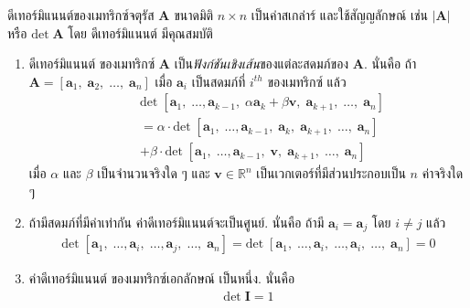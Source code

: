 %
ดีเทอร์มิแนนต์ของเมทริกซ์จตุรัส $\bm{A}$ ขนาดมิติ $n \times n$ เป็นค่าสเกล่าร์
และใช้สัญญลักษณ์ เช่น $|\bm{A}|$ หรือ $\mathrm{det}\; \bm{A}$
โดย 
ดีเทอร์มิแนนต์ มีคุณสมบัติ 
\begin{enumerate}
	\item ดีเทอร์มิแนนต์ ของเมทริกซ์ $\bm{A}$ 
เป็น\textit{ฟังก์ชันเชิงเส้น}ของแต่ละสดมภ์ของ $\bm{A}$.
	นั่นคือ
	ถ้า $\bm{A}=[\bm{a}_1, \; \bm{a}_2, \; \ldots, \; \bm{a}_n]$ เมื่อ $\bm{a}_i$ เป็นสดมภ์ที่ $i^{th}$ ของเมทริกซ์
	แล้ว
	\begin{eqnarray}
	\;& \; & \mathrm{det}\; 
	[\bm{a}_1, \; \ldots, \bm{a}_{k-1}, \;
	\alpha \bm{a}_k + \beta \bm{v}, \;
	\bm{a}_{k+1}, \; \ldots, \; \bm{a}_n]
	\nonumber \\
	\;& \; &
	=
	\alpha \cdot \mathrm{det}\; 
		[\bm{a}_1, \; \ldots, \bm{a}_{k-1}, \;
	\bm{a}_k, \;
	\bm{a}_{k+1}, \; \ldots, \; \bm{a}_n] 
	\nonumber \\
	\;& \; & 
	+ \beta \cdot  \mathrm{det}\; 
	[\bm{a}_1, \; \ldots, \bm{a}_{k-1}, \;
\bm{v}, \;
\bm{a}_{k+1}, \; \ldots, \; \bm{a}_n]
\label{eq: lin alg det prop 1}
	\end{eqnarray}
เมื่อ $\alpha$ และ $\beta$ เป็นจำนวนจริงใด ๆ
และ $\bm{v} \in \mathbb{R}^n$ เป็นเวกเตอร์ที่มีส่วนประกอบเป็น $n$ ค่าจริงใด ๆ
	\item ถ้ามีสดมภ์ที่มีค่าเท่ากัน
ค่าดีเทอร์มิแนนต์จะเป็นศูนย์.
	 นั่นคือ ถ้ามี $\bm{a}_i = \bm{a}_j$ โดย $i \neq j$ แล้ว
	 \begin{eqnarray}
	 \mathrm{det}\; 
	[\bm{a}_1, \; \ldots, \bm{a}_i, \; \ldots,
	 \bm{a}_j, \; \ldots, \; \bm{a}_n]
	 =
	 \mathrm{det}\; 
[\bm{a}_1, \; \ldots, \bm{a}_i, \; \ldots,
\bm{a}_i, \; \ldots, \; \bm{a}_n]
	 = 0
	 \label{eq: lin alg det prop 2}
	 \end{eqnarray}
	\item ค่าดีเทอร์มิแนนต์ ของเมทริกซ์เอกลักษณ์ เป็นหนึ่ง.
	นั่นคือ
	\begin{eqnarray}
	\mathrm{det}\; \bm{I} = 1
    \label{eq: lin alg det prop 3}
	\end{eqnarray}
\end{enumerate}


